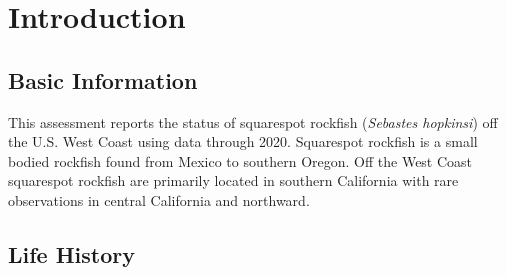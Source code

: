 \documentclass[11pt,
  english,
  a4paper,
]{article}
\begin{document}
\newcommand{\lt}{\ensuremath <}
\newcommand{\gt}{\ensuremath >}

\newlength{\cslhangindent}
\setlength{\cslhangindent}{1.5em}
\newenvironment{cslreferences}%
  {\setlength{\parindent}{0pt}%
  \everypar{\setlength{\hangindent}{\cslhangindent}}\ignorespaces}%
  {\par}

\pagebreak
{}
\setcounter{page}{1}

\pagebreak
\setlength{\parskip}{5mm plus1mm minus1mm}
\setcounter{page}{1}
\renewcommand{\thefigure}{\arabic{figure}}
\renewcommand{\thetable}{\arabic{table}}
\setcounter{table}{0}
\setcounter{figure}{0}

\setlength\parskip{0.5em plus 0.1em minus 0.2em}


\hypertarget{introduction}{%
\section{Introduction}\label{introduction}}

\leavevmode\tagmcend\tagstructend


\hypertarget{basic-information}{%
\subsection{Basic Information}\label{basic-information}}

\leavevmode\tagmcend\tagstructend


This assessment reports the status of squarespot rockfish (\emph{Sebastes hopkinsi}) off the U.S. West Coast using data through 2020. Squarespot rockfish is a small bodied rockfish found from Mexico to southern Oregon. Off the West Coast squarespot rockfish are primarily located in southern California with rare observations in central California and northward.

\leavevmode\tagmcend\tagstructend\par


\hypertarget{life-history}{%
\subsection{Life History}\label{life-history}}
\end{document}
